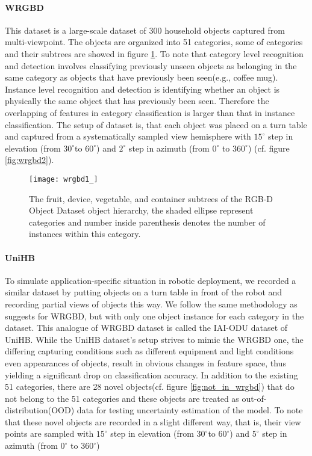 \paragraph{WRGBD\cite{lai2011large}} This dataset is a large-scale dataset of 300 household objects captured from multi-viewpoint. The objects are organized into 51 categories, some of categories and their subtrees are showed in figure \ref{fig:wrgbd1}. To note that category level recognition and detection involves classifying previously unseen objects as belonging in the same category as objects that have previously been seen(e.g., coffee
mug). Instance level recognition and detection is identifying
whether an object is physically the same object that has
previously been seen. Therefore the overlapping of features in category classification is larger than that in instance classification. The setup of dataset is, that each object was placed on a turn table and captured from a systematically sampled view hemisphere with $15^{\circ}$ step in elevation (from $30^{\circ}$to $60^{\circ}$) and $2^\circ$ step in azimuth (from $0^\circ$ to $360^\circ$) (cf. figure \ref{fig:wrgbd2}).

\begin{figure}[h!]
	\begin{center}
		\texttt{[image: wrgbd1\_]}
		\caption{The fruit, device, vegetable, and container subtrees of the RGB-D Object Dataset object hierarchy, the shaded ellipse represent categories and number inside parenthesis denotes the number of instances within this category\cite{lai2011large}.}		
		\label{fig:wrgbd1}
	\end{center} 
\end{figure}

\paragraph{UniHB} To simulate application-specific situation in robotic deployment, we recorded a similar dataset by putting objects on a turn table in front of the robot and recording partial views of objects this way. We follow the same methodology as \cite{lai2011large} suggests for WRGBD, but with only one object instance for each category in the dataset. This analogue of WRGBD dataset is called the IAI-ODU dataset of UniHB. While the UniHB dataset's setup strives to mimic the WRGBD one, the differing capturing conditions such as different equipment and light conditions even appearances of objects, result in obvious changes in feature space, thus yielding a significant drop on classification accuracy. In addition to the existing 51 categories, there are 28 novel objects(cf. figure \ref{fig:not_in_wrgbd}) that do not belong to the 51 categories and these objects are treated as out-of-distribution(OOD) data for testing uncertainty estimation of the model. To note that these novel objects are recorded in a slight different way, that is, their view points are sampled with $15^{\circ}$ step in elevation (from $30^{\circ}$to $60^{\circ}$) and $5^\circ$ step in azimuth (from $0^\circ$ to $360^\circ$)


